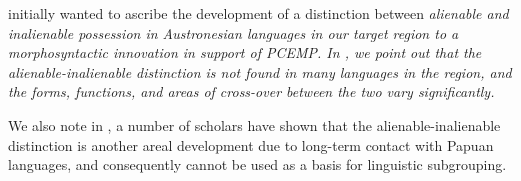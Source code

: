\citet[258f]{Blust1993} initially wanted to ascribe the development
of a distinction between \it{alienable
and inalienable} possession in Austronesian languages in our
target region to a morphosyntactic innovation in support of PCEMP.
In , we point out that the alienable-inalienable
distinction is not found in many languages in the region,
and the forms, functions,
and areas of cross-over between the two vary significantly.

We also note in ,
a number of scholars have shown that the alienable-inalienable
distinction is another areal development due to long-term contact
with Papuan languages, and consequently cannot
be used as a basis for linguistic subgrouping.

